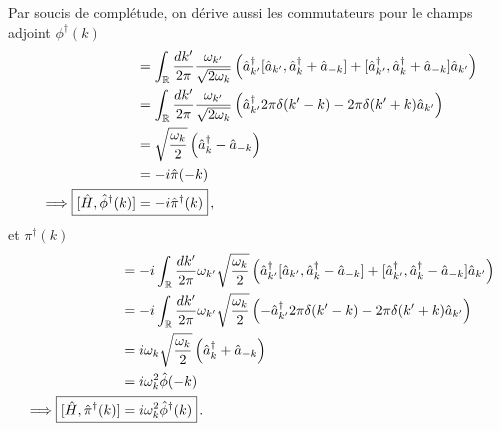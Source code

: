 \documentclass{article}
\numberwithin{equation}{section}
\theoremstyle{solution}
\begin{document}
Par soucis de complétude, on dérive aussi les commutateurs pour le champs adjoint $\phi^{\dagger}(k)$
\begin{align*}
        [\hat{H}, \hat{\phi}^{\dagger}(k)] %
        &= \int_{\mathbb{R}} \frac{dk'}{2\pi} 
         \frac{\omega_{k'}}{\sqrt{2\omega_{k}}}
        \left(  
                \hat{a}^{\dagger}_{k'}[\hat{a}_{k'}, \hat{a}^{\dagger}_{k} + \hat{a}_{-k}] 
                + [\hat{a}^{\dagger}_{k'} , \hat{a}^{\dagger}_{k} + \hat{a}_{-k}]\hat{a}_{k'} 
        \right)\\
        &= \int_{\mathbb{R}} \frac{dk'}{2\pi} 
         \frac{\omega_{k'}}{\sqrt{2\omega_{k}}}
        \left(  
                \hat{a}^{\dagger}_{k'} 2\pi\delta(k'- k) 
                - 2\pi \delta(k' + k)\hat{a}_{k'}
        \right)\\
        &= \sqrt{\frac{\omega_k}{2}} \left(  \hat{a}^{\dagger}_{k}   - \hat{a}_{-k} \right) \\
        &= -i \hat{\pi}(-k)\\
        \implies \Aboxed{[\hat{H}, \hat{\phi}^{\dagger}(k)]  &= -i\hat{\pi}^{\dagger}(k)}\, ,
\end{align*}
et $\pi^{\dagger}(k)$
\begin{align*}
        [\hat{H}, \hat{\pi}(k)] %
        &= -i  \int_{\mathbb{R}} \frac{dk'}{2\pi} 
\omega_{k'} \sqrt{\frac{\omega_k}{2}}
        \left(  
                \hat{a}^{\dagger}_{k'}[\hat{a}_{k'}, \hat{a}^{\dagger}_{k} - \hat{a}_{-k}] 
                + [\hat{a}^{\dagger}_{k'} , \hat{a}^{\dagger}_{k} - \hat{a}_{-k}]\hat{a}_{k'} 
        \right)\\
        &=-i \int_{\mathbb{R}} \frac{dk'}{2\pi} 
\omega_{k'} \sqrt{\frac{\omega_k}{2}}
        \left(  
                -\hat{a}^{\dagger}_{k'} 2\pi\delta(k' - k) 
                - 2\pi \delta(k'+ k)\hat{a}_{k'}
        \right)\\
        &= i \omega_k\sqrt{\frac{\omega_k}{2}} \left(  \hat{a}^{\dagger}_{k}  + \hat{a}_{-k} \right) \\
        &= i \omega^2_k\hat{\phi}(-k)\\
        \implies \Aboxed{[\hat{H}, \hat{\pi}^{\dagger}(k)]  &= i\omega^{2}_k\hat{\phi}^{\dagger}(k)}\, . 
\end{align*}
\end{document}
